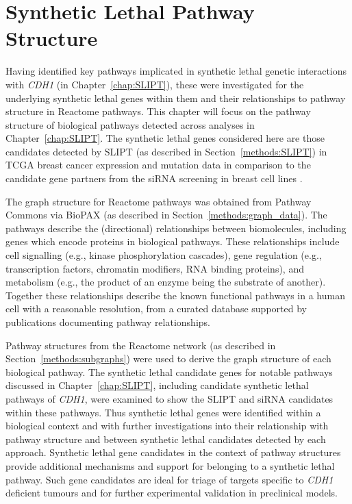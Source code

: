 \chapter{Synthetic Lethal Pathway Structure}
\label{chap:Pathways}
  
Having identified key pathways implicated in synthetic lethal genetic interactions with \textit{CDH1} (in Chapter~\ref{chap:SLIPT}), these were investigated for the underlying synthetic lethal genes within them and their relationships to pathway structure in Reactome pathways. This chapter will focus on the pathway structure of biological pathways detected across analyses in Chapter~\ref{chap:SLIPT}. The synthetic lethal genes considered here are those candidates detected by \gls{SLIPT} (as described in Section~\ref{methods:SLIPT}) in \gls{TCGA} breast cancer expression and mutation data \citep{TCGA2012} in comparison to the candidate gene partners from the \gls{siRNA} screening in breast cell lines \citep{Telford2015}. 

The graph structure for Reactome pathways was obtained from Pathway Commons via \gls{BioPAX} (as described in Section~\ref{methods:graph_data}). The pathways describe the (directional) relationships between biomolecules, including genes which encode proteins in biological pathways. These relationships include cell signalling (e.g., kinase phosphorylation cascades), gene regulation (e.g., transcription factors, chromatin modifiers, \gls{RNA} binding proteins), and metabolism (e.g., the product of an enzyme being the substrate of another). Together these relationships describe the known functional pathways in a human cell with a reasonable resolution, from a curated database supported by publications documenting pathway relationships. 

Pathway structures from the Reactome network (as described in Section~\ref{methods:subgraphs}) were used to derive the graph structure of each biological pathway. The synthetic lethal candidate genes for notable pathways discussed in Chapter~\ref{chap:SLIPT}, including candidate synthetic lethal pathways of \textit{CDH1}, were examined to show the SLIPT and siRNA candidates within these pathways. Thus synthetic lethal genes were identified within a biological context and with further investigations into their relationship with pathway structure and between synthetic lethal candidates detected by each approach. Synthetic lethal gene candidates in the context of pathway structures provide additional mechanisms and support for belonging to a synthetic lethal pathway. Such gene candidates are ideal for triage of targets specific to \textit{CDH1} deficient tumours and for further experimental validation in preclinical models.

